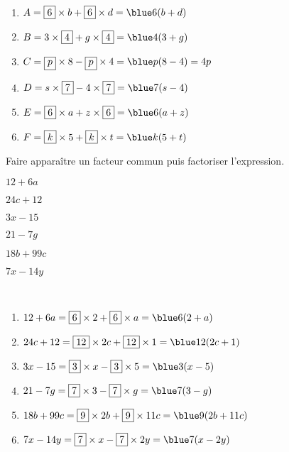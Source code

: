 \begin{colonne*exercice}
\begin{corrige}
   \ \\ [-5mm]
   \begin{enumerate}
      \item $A =\fbox{6}\times b+\fbox{6}\times d =\blue 6(b+d)$ \smallskip
      \item $B =3\times\fbox{4}+g\times\fbox{4} =\blue 4(3+g)$ \smallskip
      \item $C =\fbox{$p$}\times8-\fbox{$p$}\times4 =\blue p(8-4) =4p$ \smallskip
      \item $D =s\times\fbox{7}-4\times\fbox{7} =\blue 7(s-4)$ \smallskip
      \item $E =\fbox{6}\times a+z\times\fbox{6} =\blue 6(a+z)$ \smallskip
      \item $F =\fbox{$k$}\times5+\fbox{$k$}\times t =\blue k(5+t)$
   \end{enumerate}
\end{corrige}

\bigskip


\begin{exercice} %
   Faire apparaître un facteur commun puis factoriser l'expression.
   \begin{colenumerate}{2}
      \item $12+6a$
      \item $24c+12$
      \item $3x-15$
      \item $21-7g$
      \item $18b+99c$ 
      \item $7x-14y$
   \end{colenumerate}
\end{exercice}

\begin{corrige}
   \ \\ [-5mm]
   \begin{enumerate}
      \item $12+6a =\fbox{6}\times2+\fbox{6}\times a =\blue 6(2+a)$ \smallskip
      \item $24c+12 =\fbox{12}\times2c+\fbox{12}\times1 =\blue 12(2c+1)$ \smallskip
      \item $3x-15 =\fbox{3}\times x-\fbox{3}\times5 =\blue 3(x-5)$ \smallskip
      \item $21-7g =\fbox{7}\times3-\fbox{7}\times g =\blue 7(3-g)$ \smallskip
      \item $18b+99c =\fbox{9}\times2b+\fbox{9}\times11c =\blue 9(2b+11c)$ \smallskip
      \item $7x-14y =\fbox{7}\times x-\fbox{7}\times2y =\blue 7(x-2y)$ \\ [5mm]
   \end{enumerate}
\end{corrige}


\end{colonne*exercice}
